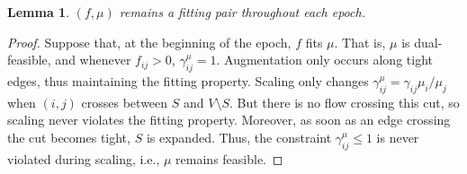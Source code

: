 \documentclass[11pt]{article}
\newtheorem{lemma}[theorem]{Lemma}
\theoremstyle{definition}
\theoremstyle{definition}
\theoremstyle{definition}
\newcommand{\fu}{f^{\mu}}
\newcommand{\nfiu}{\nabla \fu_i}
\newcommand{\biu}{b_{i}^{\mu}}
\newcommand{\gij}{\gamma_{ij}}
\newcommand{\giij}{\gamma_{ij}^{\mu}}
\newcommand{\vsrc}{V^{s}}
\newcommand{\fp}{(f,\mu)}
\DeclareMathOperator{\Ex}{Ex}
\renewcommand{\todo}[1]{\hl{TODO: #1}}
\begin{document}
%
%
%
    \begin{lemma}
        \label{lem:still-fit}
        $\fp$ remains a fitting pair throughout each epoch.
    \end{lemma}
    \begin{proof}
    Suppose that, at the beginning of the epoch, $f$ fits $\mu$. That is, $\mu$
    is dual-feasible, and whenever
    $f_{ij} > 0$, $\giij = 1$. Augmentation only occurs along tight edges, thus
    maintaining the fitting property. Scaling only changes $\giij = \gij \mu_i / \mu_j$
    when $(i, j)$ crosses between $S$ and $V \setminus S$. But there is no flow crossing
    this cut, so scaling never violates the fitting property. Moreover, as soon as an edge
    crossing the cut becomes tight, $S$ is expanded. Thus, the constraint
    $\giij \leq 1$ is never violated during scaling, i.e., $\mu$ remains feasible.
    \end{proof}
\end{document}

